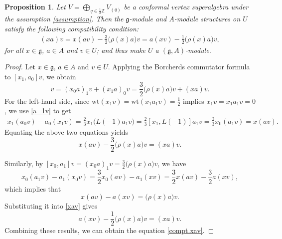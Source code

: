 \documentclass[12pt]{article}
\numberwithin{equation}{section}
\newtheorem{proposition}[theorem]{Proposition}
\theoremstyle{definition}
\theoremstyle{plain}
\newcommand{\bZ}{\ensuremath{\mathbb{Z}}}
\newcommand{\fg}{\mathfrak{g}}
\newcommand{\wt}{\mathrm{wt }}
\begin{document}
\begin{proposition}
    Let $V=\bigoplus_{q\in\frac{1}{2}\bZ}V_{(q)}$ be a conformal vertex superalgebra under the assumption \eqref{assumption}. Then the $\fg$-module and $A$-module structures on $U$ satisfy the following compatibility condition\textup{:}
    \begin{align}\label{compt.xav}
        (xa)v=x(av)-\frac{3}{2}\big(\rho(x)a\big)v=a(xv)-\frac{1}{2}\big(\rho(x)a\big)v,
    \end{align}
    for all $x\in\fg$, $a\in A$ and $v\in U$; and thus make $U$ a $(\fg,A)$-module.
\end{proposition}
\begin{proof}
    Let $x\in\fg$, $a\in A$ and $v\in U$. Applying the Borcherds commutator formula to $[x_1,a_0]v$, we obtain
    \begin{equation*}
        [x_1,a_0]v=(x_0a)_1v+(x_1a)_0v=\frac{3}{2}\big(\rho(x)a\big)v+(xa)v.
    \end{equation*}
    For the left-hand side, since $\wt(x_1v)=\wt(x_1a_1v)=\frac{1}{2}$ implies $x_1v=x_1a_1v=0$, we use \eqref{a_1v} to get
    \begin{align*}
        x_1(a_0v)-a_0(x_1v)=\frac{2}{3}x_1\big(L(-1)a_1v\big)=\frac{2}{3}[x_1,L(-1)]a_1v=\frac{2}{3}x_0(a_1v)=x(av).
    \end{align*}
    Equating the above two equations yields
    \begin{equation}\label{xav}
        x(av)-\frac{3}{2}\big(\rho(x)a\big)v=(xa)v.
    \end{equation}

    Similarly, by $[x_0,a_1]v=(x_0a)_1v=\frac{3}{2}\big(\rho(x)a\big)v$, we have
    \begin{equation*}
        x_0(a_1v)-a_1(x_0v)=\frac{3}{2}x_0(av)-a_1(xv)=\frac{3}{2}x(av)-\frac{3}{2}a(xv),
    \end{equation*}
    which implies that
    \begin{equation}\label{compt.Lie-Rine}
        x(av)-a(xv)=\big(\rho(x)a\big)v.
    \end{equation}
    Substituting it into \eqref{xav} gives
    \begin{equation*}
        a(xv)-\frac{1}{2}\big(\rho(x)a\big)v=(xa)v.
    \end{equation*}
    Combining these results, we can obtain the equation \eqref{compt.xav}.
\end{proof}
\end{document}
